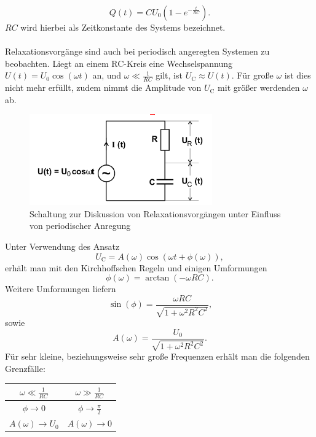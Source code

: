 \begin{equation}
	\label{eqn:entladung}
	Q(t)=CU_\text{0}(  1-e^{-\frac{t}{RC}} ) .
\end{equation}
$RC$ wird hierbei als Zeitkonstante des Systems bezeichnet.\\
\\Relaxationsvorgänge sind auch bei periodisch angeregten Systemen zu beobachten.
Liegt an einem RC-Kreis eine Wechselspannung $U(t)=U_\text{0}\cos(\omega t)$ an, und $\omega \ll \frac{1}{RC}$ gilt, ist $U_\text{C} \approx U(t)$.
Für große $\omega$ ist dies nicht mehr erfüllt, zudem nimmt die Amplitude von $U_\text{C}$ mit größer werdenden $\omega$ ab.
\begin{figure}
	\centering
	\includegraphics[width=0.7\textwidth]{bilder/periodisch.png}
	\caption{Schaltung zur Diskussion von Relaxationsvorgängen unter Einfluss von periodischer Anregung \cite{Anleitung}}
	\label{fig:periodisch}
\end{figure}
Unter Verwendung des Ansatz
\begin{equation*}
	U_\text{C}=A(\omega)\cos(\omega t +\phi(\omega)) ,
\end{equation*}
erhält man mit den Kirchhoffschen Regeln und einigen Umformungen
\begin{equation}
	\label{eqn:phase}
	\phi(\omega)=\arctan(-\omega RC) \text{.}
\end{equation}
Weitere Umformungen liefern
\begin{equation}
	\label{eqn:sinphase}
	\sin(\phi)=\frac{\omega RC}{\sqrt{1+\omega ^2R^2C^2}} \text{,}
\end{equation}
sowie
\begin{equation}
	\label{eqn:amplitude}
	A(\omega)=\frac{U_\text{0}}{\sqrt{1+\omega ^2R^2C^2}} .
\end{equation}
Für sehr kleine, beziehungsweise sehr große Frequenzen erhält man die folgenden Grenzfälle:

\begin{table}
	\centering
	\label{tab:tab1}
	\begin{tabular}{cc}
		\toprule
		$\omega \ll \frac{1}{RC} $  & $ \omega \gg \frac{1}{RC}$ \\
		\midrule
		$\phi \to 0$                & $\phi \to \frac{\pi}{2}$   \\
		$A(\omega) \to U_\text{0} $ & $A(\omega) \to 0$          \\
		\bottomrule
	\end{tabular}
\end{table}

